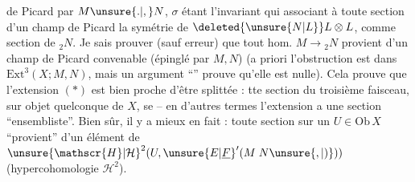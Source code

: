 \margin{\mbox{-- --}}

 de Picard  par $M\unsure{.|,}N$, $\sigma$ étant l'invariant qui  associant à toute section  d'un champ de Picard la symétrie de $\deleted{\unsure{N|L}}L\otimes L$,  comme section de ${}_{2}N$. Je sais prouver (sauf erreur) que tout hom. $M\to{}_{2}N$ provient d'un champ de Picard convenable (épinglé par $M,N$) (a priori l'obstruction est dans $\mathrm{Ext}^{3}(X;M,N)$, mais un argument ``'' prouve qu'elle est nulle). Cela prouve que l'extension $(*)$ est bien proche d'être splittée :  tte section du troisième faisceau, sur  objet quelconque de $X$, se  -- en d'autres termes l'extension a une section ``ensembliste''. Bien sûr, il y a mieux en fait : toute section sur un $U\in\mathrm{Ob}\,X$ ``provient'' d'un élément de ${\unsure{\mathscr{H}|\mathcal{H}}}^{2}(U,{\unsure{E|\underline{F}}}'(M\;N\unsure{,|)}))$ (hypercohomologie $\mathscr{H}^{2}$).


